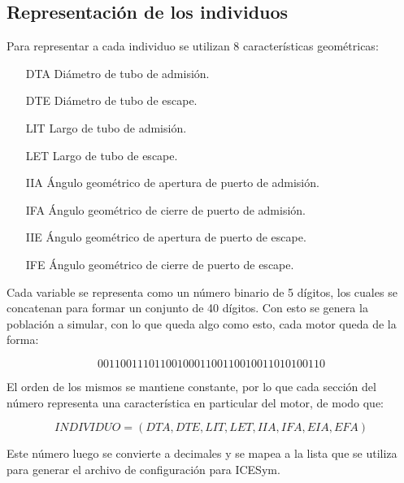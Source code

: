 \subsection{Representación de los individuos}

Para representar a cada individuo se utilizan 8 características geométricas:

\begin{enumerate}
    \item [DTA] Diámetro de tubo de admisión.
    \item [DTE] Diámetro de tubo de escape.
    \item [LIT] Largo de tubo de admisión.
    \item [LET] Largo de tubo de escape.
    \item [IIA] Ángulo geométrico de apertura de puerto de admisión.
    \item [IFA] Ángulo geométrico de cierre de puerto de admisión.
    \item [IIE] Ángulo geométrico de apertura de puerto de escape.
    \item [IFE] Ángulo geométrico de cierre de puerto de escape.
\end{enumerate}

Cada variable se representa como un número binario de 5 dígitos, los cuales se
concatenan para formar un conjunto de 40 dígitos.
%
Con esto se genera la población a simular, con lo que queda algo como esto, cada
motor queda de la forma:

\begin{equation}
  0011001110110010001100110010011010100110 \nonumber
\end{equation}

El orden de los mismos se mantiene constante, por lo que cada sección del número
representa una característica en particular del motor, de modo que:

\begin{equation}
    INDIVIDUO = (DTA, DTE, LIT, LET, IIA, IFA, EIA, EFA) \nonumber
\end{equation}

Este número luego se convierte a decimales y se mapea a la lista que se utiliza
para generar el archivo de configuración para ICESym.
%
%

